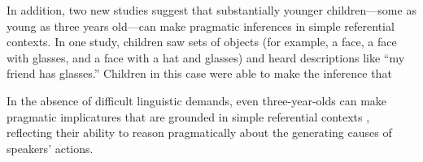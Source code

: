 In addition, two new studies suggest that substantially younger children---some as young as three years old---can make pragmatic inferences in simple referential contexts. In one study, children saw sets of objects (for example, a face, a face with glasses, and a face with a hat and glasses) and heard descriptions like ``my friend has glasses.'' Children in this case were able to make the inference that 


In the absence of difficult linguistic demands, even three-year-olds can make pragmatic implicatures that are grounded in simple referential contexts \cite{stiller2014}, reflecting their ability to reason pragmatically about the generating causes of speakers' actions. 